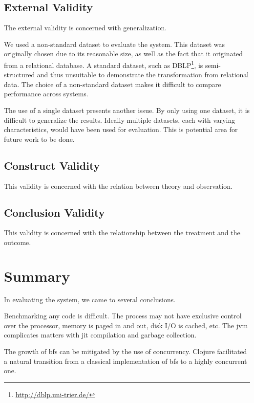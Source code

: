 		\subsection{External Validity}
		\label{sec:external-validity}
			\begin{displayquote}
				The external validity is concerned with generalization.
			\end{displayquote}
			
			We used a non-standard dataset to evaluate the system.  This dataset was originally chosen due to its reasonable size, as well as the fact that it originated from a relational database.  A standard dataset, such as DBLP\footnote{\url{http://dblp.uni-trier.de/}}, is semi-structured and thus unsuitable to demonstrate the transformation from relational data.  The choice of a non-standard dataset makes it difficult to compare performance across systems.
			
			The use of a single dataset presents another issue.  By only using one dataset, it is difficult to generalize the results.  Ideally multiple datasets, each with varying characteristics, would have been used for evaluation.  This is potential area for future work to be done.
		
		\subsection{Construct Validity}
		\label{sec:construct-validity}
			\begin{displayquote}
				This validity is concerned with the relation between theory and observation.
			\end{displayquote}
		
		\subsection{Conclusion Validity}
		\label{sec:conclusion-validity}
			\begin{displayquote}
				This validity is concerned with the relationship between the treatment and the outcome.
			\end{displayquote}
	
	\section{Summary}
	\label{sec:eval-summary}
		In evaluating the system, we came to several conclusions.
		
		Benchmarking any code is difficult.  The process may not have exclusive control over the processor, memory is paged in and out, disk I/O is cached, etc.  The \gls{jvm} complicates matters with \gls{jit} compilation and garbage collection.
		
		The growth of \gls{bfs} can be mitigated by the use of concurrency.  Clojure facilitated a natural transition from a classical implementation of \gls{bfs} to a highly concurrent one.